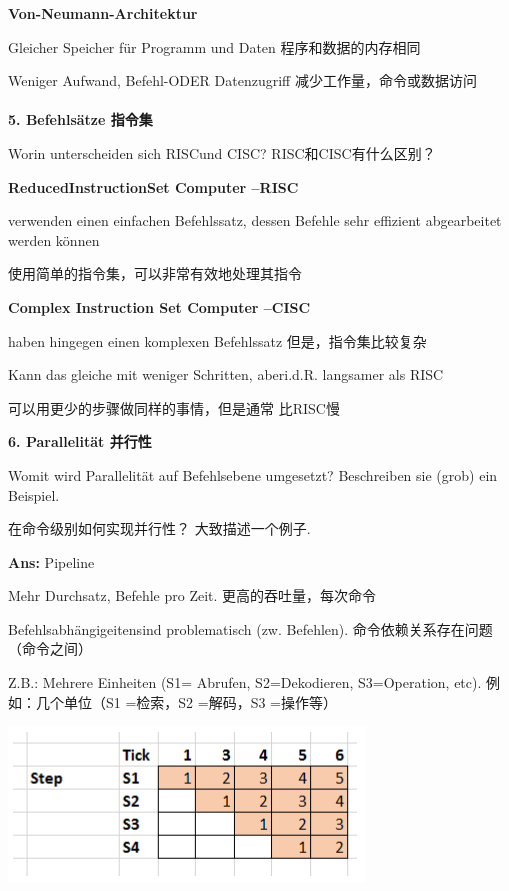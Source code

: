 \documentclass[fleqn]{article}
\begin{document}
\textbf{Von-Neumann-Architektur}

Gleicher Speicher für Programm und Daten 程序和数据的内存相同

Weniger Aufwand, Befehl-ODER Datenzugriff 减少工作量，命令或数据访问
\\
\\
\noindent\textbf{5. Befehlsätze 指令集}

Worin unterscheiden sich RISCund CISC? RISC和CISC有什么区别？

\textbf{ReducedInstructionSet Computer –RISC}

verwenden einen einfachen Befehlssatz, dessen Befehle sehr effizient abgearbeitet werden können

使用简单的指令集，可以非常有效地处理其指令

\textbf{Complex Instruction Set Computer –CISC}

haben hingegen einen komplexen Befehlssatz 但是，指令集比较复杂

Kann das gleiche mit weniger Schritten, aberi.d.R. langsamer als RISC

可以用更少的步骤做同样的事情，但是通常 比RISC慢

\noindent\textbf{6. Parallelität 并行性}

Womit wird Parallelität auf Befehlsebene umgesetzt? Beschreiben sie (grob) ein Beispiel.

在命令级别如何实现并行性？ 大致描述一个例子.

\textbf{Ans:} Pipeline

\indent\indent Mehr Durchsatz, Befehle pro Zeit. 更高的吞吐量，每次命令

\indent\indent Befehlsabhängigeitensind problematisch (zw. Befehlen). 命令依赖关系存在问题（命令之间）

\indent\indent Z.B.: Mehrere Einheiten (S1= Abrufen, S2=Dekodieren, S3=Operation, etc). 例如：几个单位（S1 =检索，S2 =解码，S3 =操作等）

\begin{center}
    \includegraphics[scale=0.6]{2.png}
\end{center}
\end{document}
